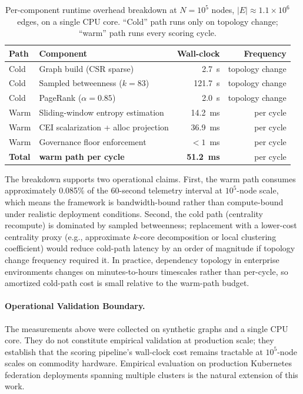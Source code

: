 \documentclass[runningheads]{llncs}
\begin{document}
\begin{table}[ht]
\caption{Per-component runtime overhead breakdown at $N = 10^5$ nodes, $|E| \approx 1.1\!\times\!10^6$ edges, on a single CPU core. ``Cold'' path runs only on topology change; ``warm'' path runs every scoring cycle.}
\label{tab:overhead}
\centering
\footnotesize
\setlength{\tabcolsep}{6pt}
\begin{tabular}{llrr}
\toprule
Path & Component & Wall-clock & Frequency \\
\midrule
Cold & Graph build (CSR sparse)              & 2.7~s    & topology change \\
Cold & Sampled betweenness ($k = 83$)        & 121.7~s  & topology change \\
Cold & PageRank ($\alpha = 0.85$)            & 2.0~s    & topology change \\
Warm & Sliding-window entropy estimation     & 14.2~ms  & per cycle \\
Warm & CEI scalarization + alloc projection  & 36.9~ms  & per cycle \\
Warm & Governance floor enforcement          & $<1$~ms  & per cycle \\
\midrule
\textbf{Total} & \textbf{warm path per cycle}  & \textbf{51.2~ms} & per cycle \\
\bottomrule
\end{tabular}
\end{table}

The breakdown supports two operational claims. First, the warm path consumes approximately 0.085\% of the 60-second telemetry interval at $10^5$-node scale, which means the framework is bandwidth-bound rather than compute-bound under realistic deployment conditions. Second, the cold path (centrality recompute) is dominated by sampled betweenness; replacement with a lower-cost centrality proxy (e.g., approximate $k$-core decomposition or local clustering coefficient) would reduce cold-path latency by an order of magnitude if topology change frequency required it. In practice, dependency topology in enterprise environments changes on minutes-to-hours timescales rather than per-cycle, so amortized cold-path cost is small relative to the warm-path budget.

\paragraph{Operational Validation Boundary.}
The measurements above were collected on synthetic graphs and a single CPU core. They do not constitute empirical validation at production scale; they establish that the scoring pipeline's wall-clock cost remains tractable at $10^5$-node scales on commodity hardware. Empirical evaluation on production Kubernetes federation deployments spanning multiple clusters is the natural extension of this work.
\end{document}
